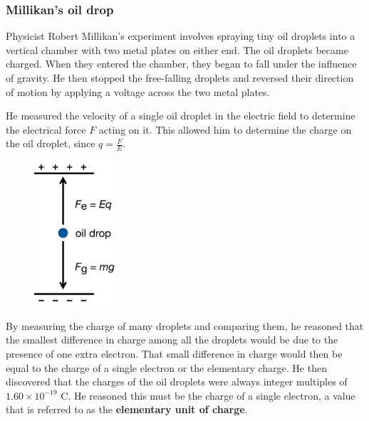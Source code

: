 \subsubsection{Millikan's oil drop}
Physicist Robert Millikan's experiment involves spraying tiny oil droplets into a vertical chamber with two metal plates on either end. The oil droplets became charged. When they entered the chamber, they began to fall under the influence of gravity. He then stopped the free-falling droplets and reversed their direction of motion by applying a voltage across the two metal plates. 

He measured the velocity of a single oil droplet in the electric field to determine the electrical force $F$ acting on it. This allowed him to determine the charge on the oil droplet, since $q=\frac{F}{E}$.

\begin{figure}[H]
    \centering
    \includegraphics[width=3cm]{images/oil-droplet_free_body_diagram.jpg}
\end{figure}

By measuring the charge of many droplets and comparing them, he reasoned that the smallest difference in charge among all the droplets would be due to the presence of one extra electron. That small difference in charge would then be equal to the charge of a single electron or the elementary charge. He then discovered that the charges of the oil droplets were always integer multiples of $1.60 \times 10^{-19}$ \unit{C}. He reasoned this must be the charge of a single electron, a value that is referred to as the \textbf{elementary unit of charge}.

\pagebreak

